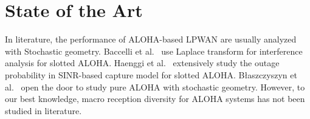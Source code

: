 \section{State of the Art}
In literature, the performance of ALOHA-based LPWAN are usually analyzed with Stochastic geometry. Baccelli et al.~\cite{baccelli2006aloha} use Laplace transform for interference analysis for slotted ALOHA. Haenggi et al.~\cite{haenggi2009interference} extensively study the outage probability in SINR-based capture model for slotted ALOHA. B{\l}aszczyszyn et al.~\cite{blaszczyszyn2010stochastic} open the door to study pure ALOHA with stochastic geometry. However, to our best knowledge, macro reception diversity for ALOHA systems has not been studied in literature.
